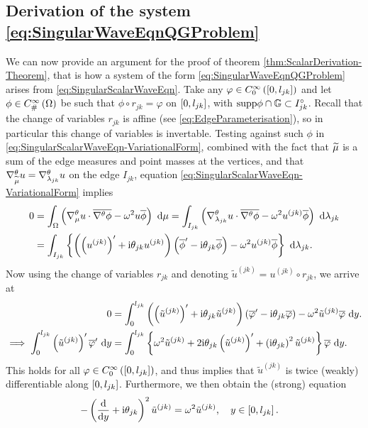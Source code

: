 \subsection{Derivation of the system \eqref{eq:SingularWaveEqnQGProblem}} \label{ssec:Scalar-QGDerivation}
We can now provide an argument for the proof of theorem \ref{thm:ScalarDerivation-Theorem}, that is how a system of the form \eqref{eq:SingularWaveEqnQGProblem} arises from \eqref{eq:SingularScalarWaveEqn}.
Take any $\varphi\in C^{\infty}_{0}\left( \left[ 0,l_{jk} \right] \right)$ and let $\phi\in C^{\infty}_{\#}\left( \Omega \right)$ be such that $\phi\circ r_{jk} = \varphi$ on $\left[ 0,l_{jk} \right]$, with $\mathrm{supp}\phi\cap\mathbb{G}\subset I_{jk}^{\circ}$.
Recall that the change of variables $r_{jk}$ is affine (see \eqref{eq:EdgeParameterisation}), so in particular this change of variables is invertable.
Testing against such $\phi$ in \eqref{eq:SingularScalarWaveEqn-VariationalForm}, combined with the fact that $\widetilde{\mu}$ is a sum of the edge measures and point masses at the vertices, and that $\nabla^{\theta}_{\widetilde{\mu}}u=\nabla^{\theta}_{\lambda_{jk}}u$ on the edge $I_{jk}$, equation \eqref{eq:SingularScalarWaveEqn-VariationalForm} implies
\begin{align*}
	0 &= \int_{\Omega} \left( \nabla^{\theta}_\mu u \cdot \overline{\nabla^{\theta}\phi} - \omega^2 u\overline{\phi} \right)  \ \mathrm{d}\mu
	= \int_{I_{jk}} \left( \nabla^{\theta}_{\lambda_{jk}}u \cdot \overline{\nabla^{\theta}\phi} - \omega^2 u^{(jk)}\overline{\phi} \right)  \ \mathrm{d}\lambda_{jk} \\
	&= \int_{I_{jk}} \left\{  \left( \left( u^{(jk)} \right)' + \mathrm{i}\theta_{jk} u^{(jk)} \right)\left( \overline{\phi}' - \mathrm{i}\theta_{jk} \overline{\phi}  \right) - \omega^2 u^{(jk)}\overline{\phi}  \right\}  \ \mathrm{d}\lambda_{jk}.
\end{align*}
Now using the change of variables $r_{jk}$ and denoting $\tilde{u}^{(jk)} = u^{(jk)} \circ r_{jk}$, we arrive at
\begin{align*}
	0 &= \int_{0}^{l_{jk}} \left( \left( \tilde{u}^{(jk)} \right)' + \mathrm{i}\theta_{jk} \tilde{u}^{(jk)} \right)\left( \overline{\varphi}' - \mathrm{i}\theta_{jk} \overline{\varphi}  \right) - \omega^2 \tilde{u}^{(jk)}\overline{\varphi} \ \mathrm{d} y. \\
	\implies
	\int_{0}^{l_{jk}} \left( \tilde{u}^{(jk)} \right)'\overline{\varphi}' \ \mathrm{d} y &=
	\int_{0}^{l_{jk}} \left\{  \omega^2\tilde{u}^{(jk)} + 2\mathrm{i}\theta_{jk}\left( \tilde{u}^{(jk)} \right)' + \left( \mathrm{i}\theta_{jk} \right)^2\tilde{u}^{(jk)}  \right\} \overline{\varphi} \ \mathrm{d} y.
\end{align*}
This holds for all $\varphi\in C^{\infty}_{0}\left( \left[ 0,l_{jk} \right] \right)$, and thus implies that $\tilde{u}^{(jk)}$ is twice (weakly) differentiable along $\left[ 0,l_{jk} \right]$.
Furthermore, we then obtain the (strong) equation
\begin{align*}
	-\left( \dfrac{\mathrm{d}}{\mathrm{d}y} + \mathrm{i}\theta_{jk} \right)^2 \tilde{u}^{(jk)} &= \omega^2 \tilde{u}^{(jk)}, \quad y\in\left[ 0,l_{jk} \right].
\end{align*}

